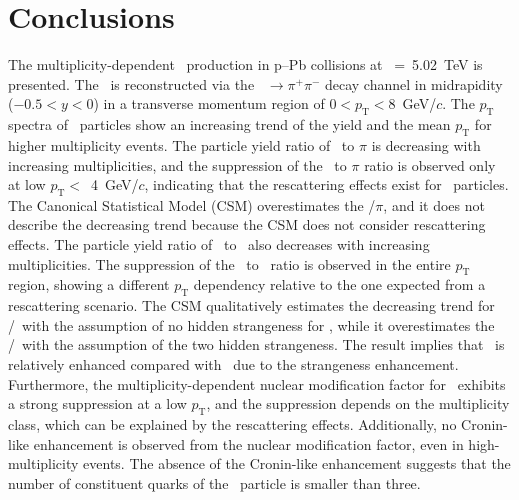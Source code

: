 
\section{Conclusions}
\label{sec:summary}

The multiplicity-dependent \fzero~production in p--Pb collisions at \snn~=~5.02~TeV is presented. The \fzero~is reconstructed via the \fzero~$\rightarrow\pi^{+}\pi^{-}$ decay channel in midrapidity ($-0.5<y<0$) in a transverse momentum region of $0<p_{\mathrm{T}}<8$~GeV/$c$. The $p_{\mathrm{T}}$ spectra of \fzero~particles show an increasing trend of the yield and the mean $p_{\mathrm{T}}$ for higher multiplicity events. The particle yield ratio of \fzero~to $\pi$ is decreasing with increasing multiplicities, and the suppression of the \fzero~to $\pi$ ratio is observed only at low $p_{\mathrm{T}}<$~4~GeV/$c$, indicating that the rescattering effects exist for \fzero~particles. The Canonical Statistical Model (CSM) overestimates the \fzero/$\pi$, and it does not describe the decreasing trend because the CSM does not consider rescattering effects. The particle yield ratio of \fzero~to \kstar~also decreases with increasing multiplicities. The suppression of the \fzero~to \kstar~ratio is observed in the entire $p_{\mathrm{T}}$ region, showing a different $p_{\mathrm{T}}$ dependency relative to the one expected from a rescattering scenario. The CSM qualitatively estimates the decreasing trend for \fzero/\kstar~with the assumption of no hidden strangeness for \fzero, while it overestimates the \fzero/\kstar~with the assumption of the two hidden strangeness. The result implies that \kstar~is relatively enhanced compared with \fzero~due to the strangeness enhancement. Furthermore, the multiplicity-dependent nuclear modification factor for \fzero~exhibits a strong suppression at a low $p_{\mathrm{T}}$, and the suppression depends on the multiplicity class, which can be explained by the rescattering effects. Additionally, no Cronin-like enhancement is observed from the nuclear modification factor, even in high-multiplicity events. The absence of the Cronin-like enhancement suggests that the number of constituent quarks of the \fzero~particle is smaller than three.